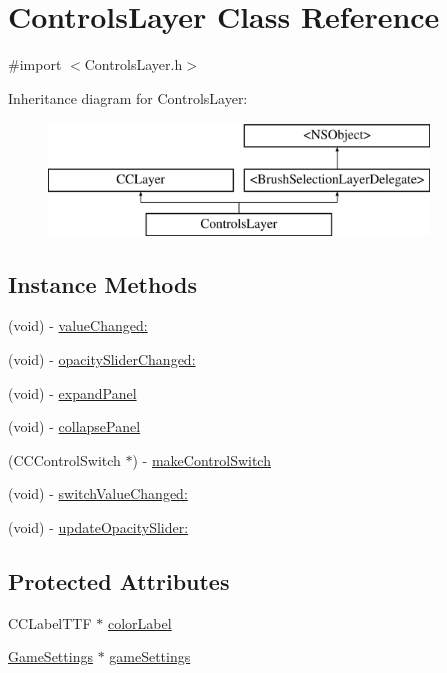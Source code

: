\hypertarget{interface_controls_layer}{\section{Controls\-Layer Class Reference}
\label{d1/d1a/interface_controls_layer}
}


{\ttfamily \#import $<$Controls\-Layer.\-h$>$}

Inheritance diagram for Controls\-Layer\-:\begin{figure}[H]
\begin{center}
\leavevmode
\includegraphics[height=3.000000cm]{d1/d1a/interface_controls_layer}
\end{center}
\end{figure}
\subsection*{Instance Methods}
\begin{DoxyCompactItemize}
\item 
(void) -\/ \hyperlink{interface_controls_layer_a883bebd74a6a657ded8e74a33ea13228}{value\-Changed\-:}
\item 
(void) -\/ \hyperlink{interface_controls_layer_a83c9c1fd8899606cca2535589c0f0b45}{opacity\-Slider\-Changed\-:}
\item 
(void) -\/ \hyperlink{interface_controls_layer_a9891f37671f87b622eb28a252e2e5190}{expand\-Panel}
\item 
(void) -\/ \hyperlink{interface_controls_layer_afddcb3b6b63d05a784b18cb129ec5643}{collapse\-Panel}
\item 
(C\-C\-Control\-Switch $\ast$) -\/ \hyperlink{interface_controls_layer_a17c02c66db2aa779b9b7af552eb43a46}{make\-Control\-Switch}
\item 
(void) -\/ \hyperlink{interface_controls_layer_a02affb06b2d595b54d10b3593a8370f2}{switch\-Value\-Changed\-:}
\item 
(void) -\/ \hyperlink{interface_controls_layer_a5d92a7806c63fd37b54b6071dfdc611b}{update\-Opacity\-Slider\-:}
\end{DoxyCompactItemize}
\subsection*{Protected Attributes}
\begin{DoxyCompactItemize}
\item 
C\-C\-Label\-T\-T\-F $\ast$ \hyperlink{interface_controls_layer_aa3d424dcbfa618632f97478ee61148cb}{color\-Label}
\item 
\hyperlink{interface_game_settings}{Game\-Settings} $\ast$ \hyperlink{interface_controls_layer_a6fb04c60ed1bfab11e2940a025b4927e}{game\-Settings}
\end{DoxyCompactItemize}
